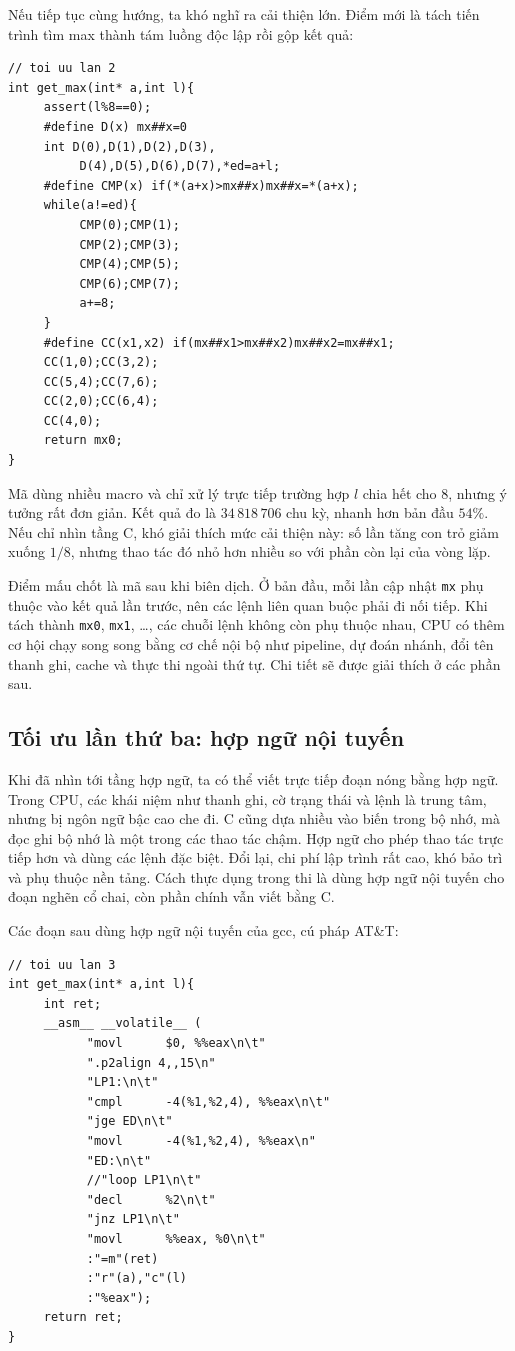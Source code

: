 \documentclass[11pt]{article}
\begin{document}
Nếu tiếp tục cùng hướng, ta khó nghĩ ra cải thiện lớn. Điểm mới là tách tiến
trình tìm max thành tám luồng độc lập rồi gộp kết quả:
\begin{verbatim}
// toi uu lan 2
int get_max(int* a,int l){
     assert(l%8==0);
     #define D(x) mx##x=0
     int D(0),D(1),D(2),D(3),
          D(4),D(5),D(6),D(7),*ed=a+l;
     #define CMP(x) if(*(a+x)>mx##x)mx##x=*(a+x);
     while(a!=ed){
          CMP(0);CMP(1);
          CMP(2);CMP(3);
          CMP(4);CMP(5);
          CMP(6);CMP(7);
          a+=8;
     }
     #define CC(x1,x2) if(mx##x1>mx##x2)mx##x2=mx##x1;
     CC(1,0);CC(3,2);
     CC(5,4);CC(7,6);
     CC(2,0);CC(6,4);
     CC(4,0);
     return mx0;
}
\end{verbatim}

Mã dùng nhiều macro và chỉ xử lý trực tiếp trường hợp \(l\) chia hết cho 8,
nhưng ý tưởng rất đơn giản. Kết quả đo là \(34\,818\,706\) chu kỳ, nhanh hơn
bản đầu \(54\%\). Nếu chỉ nhìn tầng C, khó giải thích mức cải thiện này: số
lần tăng con trỏ giảm xuống \(1/8\), nhưng thao tác đó nhỏ hơn nhiều so với
phần còn lại của vòng lặp.

Điểm mấu chốt là mã sau khi biên dịch. Ở bản đầu, mỗi lần cập nhật
\texttt{mx} phụ thuộc vào kết quả lần trước, nên các lệnh liên quan buộc phải
đi nối tiếp. Khi tách thành \texttt{mx0}, \texttt{mx1}, \ldots, các chuỗi lệnh
không còn phụ thuộc nhau, CPU có thêm cơ hội chạy song song bằng cơ chế nội
bộ như pipeline, dự đoán nhánh, đổi tên thanh ghi, cache và thực thi ngoài
thứ tự. Chi tiết sẽ được giải thích ở các phần sau.

\subsection{Tối ưu lần thứ ba: hợp ngữ nội tuyến}

Khi đã nhìn tới tầng hợp ngữ, ta có thể viết trực tiếp đoạn nóng bằng hợp ngữ.
Trong CPU, các khái niệm như thanh ghi, cờ trạng thái và lệnh là trung tâm,
nhưng bị ngôn ngữ bậc cao che đi. C cũng dựa nhiều vào biến trong bộ nhớ, mà
đọc ghi bộ nhớ là một trong các thao tác chậm. Hợp ngữ cho phép thao tác trực
tiếp hơn và dùng các lệnh đặc biệt. Đổi lại, chi phí lập trình rất cao, khó
bảo trì và phụ thuộc nền tảng. Cách thực dụng trong thi là dùng hợp ngữ nội
tuyến cho đoạn nghẽn cổ chai, còn phần chính vẫn viết bằng C.

Các đoạn sau dùng hợp ngữ nội tuyến của gcc, cú pháp AT\&T:
\begin{verbatim}
// toi uu lan 3
int get_max(int* a,int l){
     int ret;
     __asm__ __volatile__ (
           "movl      $0, %%eax\n\t"
           ".p2align 4,,15\n"
           "LP1:\n\t"
           "cmpl      -4(%1,%2,4), %%eax\n\t"
           "jge ED\n\t"
           "movl      -4(%1,%2,4), %%eax\n"
           "ED:\n\t"
           //"loop LP1\n\t"
           "decl      %2\n\t"
           "jnz LP1\n\t"
           "movl      %%eax, %0\n\t"
           :"=m"(ret)
           :"r"(a),"c"(l)
           :"%eax");
     return ret;
}
\end{verbatim}
\end{document}
